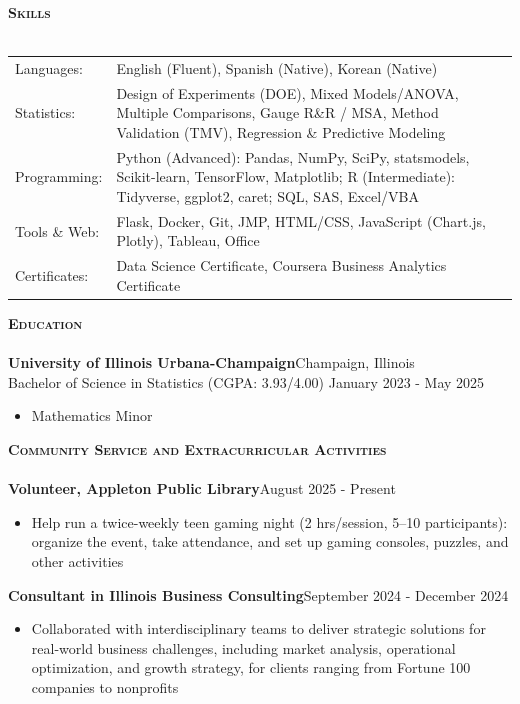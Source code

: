 \documentclass[a4paper]{article}
\newcommand{\lineunder} {
    \vspace*{-8pt} \\
    \hspace*{-18pt} \hrulefill \\
}
\newcommand{\header} [1] {
    {\hspace*{-18pt}\vspace*{6pt} \textsc{#1}}
    \vspace*{-6pt} \lineunder
}
\begin{document}
\header{\textbf{Skills}}
\begin{tabular}{@{}l >{\raggedright\arraybackslash}p{}@{}}
    Languages: & English (Fluent), Spanish (Native), Korean (Native) \\
    Statistics: & Design of Experiments (DOE), Mixed Models/ANOVA, Multiple Comparisons, Gauge R\&R / MSA, Method Validation (TMV), Regression \& Predictive Modeling \\
    Programming: & Python (Advanced): Pandas, NumPy, SciPy, statsmodels, Scikit-learn, TensorFlow, Matplotlib; R (Intermediate): Tidyverse, ggplot2, caret; SQL, SAS, Excel/VBA \\
    Tools \& Web: & Flask, Docker, Git, JMP, HTML/CSS, JavaScript (Chart.js, Plotly), Tableau, Office \\
    Certificates: & Data Science Certificate, Coursera Business Analytics Certificate
\end{tabular}

\vspace{2mm}

\header{\textbf{Education}}
\textbf{University of Illinois Urbana-Champaign}\hfill Champaign, Illinois \\
Bachelor of Science in Statistics (CGPA: 3.93/4.00) \hfill January 2023 - May 2025\\
    \begin{itemize}[noitemsep]
        \item Mathematics Minor
    \end{itemize}

\vspace{1mm}

\header{\textbf{Community Service and Extracurricular Activities}}
\textbf{Volunteer, Appleton Public Library}\hfill August 2025 - Present\\
\begin{itemize}[noitemsep]
    \item Help run a twice-weekly teen gaming night (2 hrs/session, 5--10 participants): organize the event, take attendance, and set up gaming consoles, puzzles, and other activities
\end{itemize}

\textbf{Consultant in Illinois Business Consulting}\hfill September 2024 - December 2024\\
\begin{itemize}[nolistsep]
    \item Collaborated with interdisciplinary teams to deliver strategic solutions
    for real-world business challenges, including market analysis,
    operational optimization, and growth strategy, for clients ranging from Fortune
    100 companies to nonprofits
\end{itemize}
\end{document}
